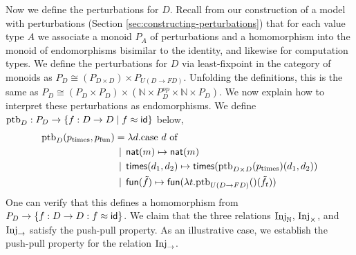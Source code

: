 Now we define the perturbations for $D$.
Recall from our construction of a model with perturbations
(Section \ref{sec:constructing-perturbations}) that for each value
type $A$ we associate a monoid $P_A$ of perturbations
and a homomorphism into the monoid of endomorphisms bisimilar to the identity,
and likewise for computation types.
We define the perturbations for $D$ via least-fixpoint in the category of monoids as
%
\( P_D \cong (P_{D \times D}) \times P_{U(D \to FD)}. \)
%
Unfolding the definitions, this is the same as
%
\( P_D \cong (P_D \times P_D) \times (\mathbb{N} \times P_D^{op} \times \mathbb{N} \times P_D). \)
%
We now explain how to interpret these perturbations as endomorphisms.
We define $\text{ptb}_D : P_D \to \{ f : D \to D \mid f \approx \mathsf{id} \}$ below,
%
%
\begin{align*}
 \text{ptb}_D(p_{\text{times}}, p_{\text{fun}}) &= \lambda d.\text{case $d$ of}  \\
 &\mathrel{\bf \,\mid\,} \mathsf{nat}(m) \mapsto \mathsf{nat}(m) \\
    &\mathrel{\bf \,\mid\,} \mathsf{times}(d_1, d_2) \mapsto {\mathsf{times}(\text{ptb}_{D \times D}(p_\text{times})(d_1, d_2))} \\
    &\mathrel{\bf \,\mid\,} \mathsf{fun}(\tilde{f}) \mapsto {\mathsf{fun}(\lambda t. \text{ptb}_{U(D \to FD)}()(\tilde{f}_t))}
\end{align*}
One can verify that this defines a homomorphism from $P_D \to \{ f : D \to D : f \approx \mathsf{id} \}$.
We claim that the three relations $\text{Inj}_\mathbb{N}$, $\text{Inj}_\times$, and $\text{Inj}_\to$
satisfy the push-pull property.
As an illustrative case, we establish the push-pull property for the relation $\text{Inj}_\to$.
